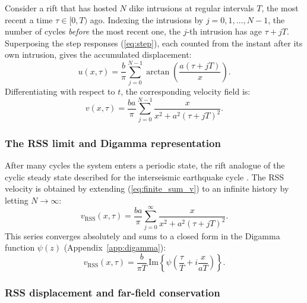 \documentclass[extra]{gji}
\newcommand{\IM}{\mathrm{Im}}
\begin{document}
Consider a rift that has hosted $N$ dike intrusions at regular intervals
$T$, the most recent a time $\tau\in[0,T)$ ago. Indexing the intrusions by
$j=0,1,\dots,N-1$, the number of cycles \emph{before} the most recent one,
the $j$-th intrusion has age $\tau+jT$. Superposing the step responses
(\ref{eq:step}), each counted from the instant after its own intrusion,
gives the accumulated displacement:
\begin{equation}
u(x,\tau) = \frac{b}{\pi}\sum_{j=0}^{N-1}
  \arctan\!\left(\frac{a(\tau+jT)}{x}\right).
\label{eq:finite_sum}
\end{equation}
Differentiating with respect to $t$, the corresponding velocity field is:
\begin{equation}
v(x,\tau) = \frac{b a}{\pi}\sum_{j=0}^{N-1}
  \frac{x}{x^2 + a^2(\tau+jT)^2}.
\label{eq:finite_sum_v}
\end{equation}

\subsubsection{The RSS limit and Digamma representation}

After many cycles the system enters a periodic state, the rift analogue of the
cyclic steady state described for the interseismic earthquake cycle \citep{thatcher1984viscoelastic,hetland2006interseismic}.
The RSS velocity is obtained by extending
(\ref{eq:finite_sum_v}) to an infinite history by letting $N\to\infty$:
\begin{equation}
v_{\text{RSS}}(x,\tau) = \frac{b a}{\pi}
  \sum_{j=0}^{\infty}\frac{x}{x^2 + a^2(\tau+jT)^2}.
\label{eq:css_sum}
\end{equation}
This series converges absolutely and sums to a closed form in
the Digamma function $\psi(z)$ (Appendix~\ref{app:digamma}):
\begin{equation}
v_{\text{RSS}}(x,\tau) =
  \frac{b}{\pi T}\,\IM\!\left\{
    \psi\!\left(\frac{\tau}{T}+i\frac{x}{aT}\right)
  \right\}.
\label{eq:vcss}
\end{equation}

\subsubsection{RSS displacement and far-field conservation}
\end{document}
